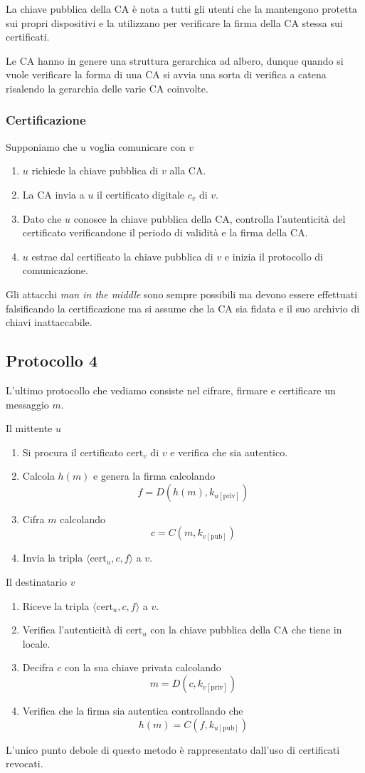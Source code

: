 La chiave pubblica della CA \`e nota a tutti gli utenti che la mantengono protetta sui propri dispositivi e la
utilizzano per verificare la firma della CA stessa sui certificati.

Le CA hanno in genere una struttura gerarchica ad albero, dunque quando si vuole verificare la forma di una CA si avvia
una sorta di verifica a catena risalendo la gerarchia delle varie CA coinvolte.

\subsubsection{Certificazione}
Supponiamo che $u$ voglia comunicare con $v$
\begin{enumerate}
	\item $u$ richiede la chiave pubblica di $v$ alla CA.
	\item La CA invia a $u$ il certificato digitale $c_v$ di $v$.
	\item Dato che $u$ conosce la chiave pubblica della CA, controlla l'autenticit\`a del certificato verificandone il
	      periodo di validit\`a e la firma della CA.
	\item $u$ estrae dal certificato la chiave pubblica di $v$ e inizia il protocollo di comunicazione.
\end{enumerate}
Gli attacchi \emph{man in the middle} sono sempre possibili ma devono essere effettuati falsificando la certificazione
ma si assume che la CA sia fidata e il suo archivio di chiavi inattaccabile.

\subsection{Protocollo 4}
L'ultimo protocollo che vediamo consiste nel cifrare, firmare e certificare un messaggio $m$.

Il mittente $u$
\begin{enumerate}
	\item Si procura il certificato $\text{cert}_v$ di $v$ e verifica che sia autentico.
	\item Calcola $h(m)$ e genera la firma calcolando
	      \[ f = D(h(m), k_{u [\text{priv}]}) \]
	\item Cifra $m$ calcolando
	      \[ c = C(m, k_{v [\text{pub}]}) \]
	\item Invia la tripla $\langle \text{cert}_u, c, f \rangle$ a $v$.
\end{enumerate}
Il destinatario $v$
\begin{enumerate}
	\item Riceve la tripla $\langle \text{cert}_u, c, f \rangle$ a $v$.
	\item Verifica l'autenticit\`a di $\text{cert}_u$ con la chiave pubblica della CA che tiene in locale.
	\item Decifra $c$ con la sua chiave privata calcolando
	      \[ m = D(c, k_{v [\text{priv}]}) \]
	\item Verifica che la firma sia autentica controllando che
	      \[ h(m) = C(f, k_{u [\text{pub}]}) \]
\end{enumerate}
L'unico punto debole di questo metodo \`e rappresentato dall'uso di certificati revocati.

